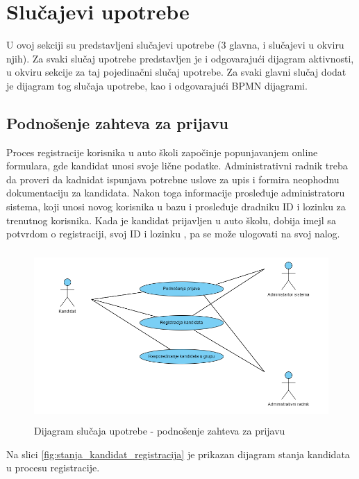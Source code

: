 \section{Slučajevi upotrebe}
\label{sec:podnaslov2}
U ovoj sekciji su predstavljeni slučajevi upotrebe (3 glavna, i slučajevi u okviru njih).
Za svaki slučaj upotrebe predstavljen je i odgovarajući dijagram aktivnosti, 
u okviru sekcije za taj pojedinačni slučaj upotrebe.
Za svaki glavni slučaj dodat je dijagram tog slučaja upotrebe, kao i odgovarajući BPMN dijagrami.
\subsection {Podnošenje zahteva za prijavu}
Proces registracije korisnika u auto školi započinje popunjavanjem online formulara, gde kandidat unosi svoje lične podatke. 
Administrativni radnik treba da proveri da kadnidat ispunjava potrebne uslove za upis i formira neophodnu dokumentaciju za kandidata. 
Nakon toga informacije prosleđuje administratoru sistema, koji unosi novog korisnika u bazu i prosleđuje dradniku ID i lozinku za trenutnog korisnika. 
Kada je kandidat prijavljen u auto školu, dobija imejl sa potvrdom o registraciji, svoj ID i lozinku , pa se može ulogovati na svoj nalog. 

\begin{figure}[H]
    \begin{center}
        \includegraphics[width=140mm, height=65mm]{Diagrams/podnosenje_zahteva_za_prijavu.png}
    \end{center}
    \caption {Dijagram slučaja upotrebe - podnošenje zahteva za prijavu}
    \label{usecase_podnosenje_zahteva_za_prijavu}

\end{figure}

Na slici \ref{fig:stanja_kandidat_registracija} je prikazan dijagram stanja kandidata u procesu registracije.

